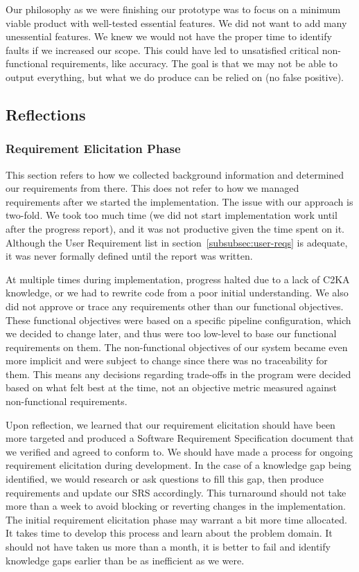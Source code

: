 Our philosophy as we were finishing our prototype was to focus on a minimum viable product with well-tested essential features.
We did not want to add many unessential features.
We knew we would not have the proper time to identify faults if we increased our scope.
This could have led to unsatisfied critical non-functional requirements, like accuracy.
The goal is that we may not be able to output everything, but what we do produce can be relied on (no false positive).

\subsection{Reflections}\label{subsec:reflections}
\subsubsection{Requirement Elicitation Phase}\label{subsubsec:req-elicit-refl}
This section refers to how we collected background information and determined our requirements from there.
This does not refer to how we managed requirements after we started the implementation.
The issue with our approach is two-fold.
We took too much time (we did not start implementation work until after the progress report), and it was not productive given the time spent on it.
Although the User Requirement list in section~\ref{subsubsec:user-reqs} is adequate, it was never formally defined until the report was written.

At multiple times during implementation, progress halted due to a lack of C2KA knowledge,
or we had to rewrite code from a poor initial understanding.
We also did not approve or trace any requirements other than our functional objectives.
These functional objectives were based on a specific pipeline configuration, which we decided to change later,
and thus were too low-level to base our functional requirements on them.
The non-functional objectives of our system became even more implicit and were subject to change since there was no traceability for them.
This means any decisions regarding trade-offs in the program were decided based on what felt best at the time,
not an objective metric measured against non-functional requirements.

Upon reflection, we learned that our requirement elicitation should have been more targeted and produced a Software Requirement Specification document that we verified and agreed to conform to.
We should have made a process for ongoing requirement elicitation during development.
In the case of a knowledge gap being identified, we would research or ask questions to fill this gap,
then produce requirements and update our SRS accordingly.
This turnaround should not take more than a week to avoid blocking or reverting changes in the implementation.
The initial requirement elicitation phase may warrant a bit more time allocated.
It takes time to develop this process and learn about the problem domain.
It should not have taken us more than a month,
it is better to fail and identify knowledge gaps earlier than be as inefficient as we were.

